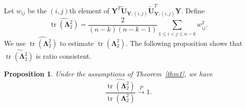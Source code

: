 \documentclass[12pt]{article} %
\DeclareMathOperator{\mytr}{tr}
\DeclareMathOperator{\mydiag}{diag}
\newcommand{\bZ}{\mathbf{Z}}
\newcommand{\bP}{\mathbf{P}}
\newcommand{\bY}{\mathbf{Y}}
\newcommand{\bU}{\mathbf{U}}
\newcommand{\bD}{\mathbf{D}}
\newcommand{\bV}{\mathbf{V}}
\newcommand{\bfsym}[1]{\ensuremath{\boldsymbol{#1}}}
\def\bLambda {\bfsym {\Lambda}}
\newtheorem{proposition}{Proposition}
\theoremstyle{definition}
\begin{document}
    Let $w_{ij}$ be the $(i,j)$th element of $\bY^T \tilde{\bU}_{\bY;(i,j)} \tilde{\bU}_{\bY;(i,j)}^T \bY$.
    Define
    $$
    \widehat{\mytr(\bLambda_2^2)}=\frac{2}{(n-k)(n-k-1)}\sum_{1\leq i<j\leq n-k}w_{ij}^2.
    $$
    We use $\widehat{\mytr(\bLambda_2^2)}$ to estimate $\mytr(\bLambda_2^2)$.
    The following proposition shows that $\widehat{\mytr(\bLambda_2^2)}$ is  ratio consistent.
    \begin{proposition}\label{Taichangle}
        Under the assumptions of Theorem~\ref{thm1}, we have
        $$
        \frac{\widehat{\mytr(\bLambda^2_2)}}{\mytr(\bLambda^2_2)} \xrightarrow{P} 1.
        $$

    \end{proposition}


%
%
%
%
%
\end{document}

